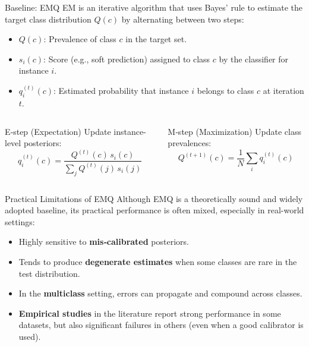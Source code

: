 \documentclass[aspectratio=169]{beamer}
\begin{document}
\begin{frame}{Baseline: EMQ}
  EM is an iterative algorithm that uses Bayes’ rule to estimate the target class distribution $Q(c)$ by alternating between two steps:
  
  \begin{itemize}
    \item $Q(c)$: Prevalence of class $c$ in the target set.
    \item $s_i(c)$: Score (e.g., soft prediction) assigned to class $c$ by the classifier for instance $i$.
    \item $q_i^{(t)}(c)$: Estimated probability that instance $i$ belongs to class $c$ at iteration $t$.
  \end{itemize}

  \begin{columns}
    \begin{column}{0.4\textwidth}
      \begin{block}{E‑step (Expectation)}
        \small
        Update instance-level posteriors:
        $$q_i^{(t)}(c)=\frac{Q^{(t)}(c)\,s_i(c)}{\sum_{j}Q^{(t)}(j)\,s_i(j)}$$
      \end{block}
    \end{column}
    \begin{column}{0.4\textwidth}
      \begin{block}{M‑step (Maximization)}
        \small
        Update class prevalences:
        $$Q^{(t+1)}(c)=\frac{1}{N}\sum_i q_i^{(t)}(c)$$
      \end{block}
    \end{column}
  \end{columns}
\end{frame}


\begin{frame}{Practical Limitations of EMQ}
  Although EMQ is a theoretically sound and widely adopted baseline, its practical performance is often mixed, especially in real-world settings:

  \begin{itemize}
    \item Highly sensitive to \textbf{mis‑calibrated} posteriors.
    \item Tends to produce \textbf{degenerate estimates} when some classes are rare in the test distribution.
    \item In the \textbf{multiclass} setting, errors can propagate and compound across classes.\pause
    \item \textbf{Empirical studies} in the literature report strong performance in some datasets, but also significant failures in others (even when a good calibrator is used).
  \end{itemize}
\end{frame}
\end{document}
